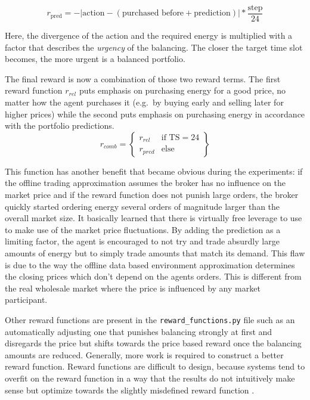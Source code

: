 \begin{equation}
    r_{\text{pred}} = - | \text{action} - (\text{purchased before} + \text{prediction}) | * \frac{\text{step}}{24}
\end{equation}

Here, the divergence of the action and the required energy is multiplied with a factor that describes the \emph{urgency}
of the balancing. The closer the target time slot becomes, the more urgent is a balanced portfolio.

The final reward is now a combination of those two reward terms. The first reward function $r_{rel}$ puts emphasis on purchasing
energy for a good price, no matter how the agent purchases it (e.g.\ by buying early and selling later for higher
prices) while the second puts emphasis on purchasing energy in accordance with the portfolio predictions. 
\begin{equation}
    r_{comb} = \left\{
        \begin{array}{lr}
            r_{rel} & \text{if TS} = 24 \\
            r_{pred} & \text{else} 
        \end{array}
    \right\}
\end{equation}

This function has another benefit that became obvious during the experiments: if the offline trading approximation
assumes the broker has no influence on the market price and if the reward function does not punish large orders, the
broker quickly started ordering energy several orders of magnitude larger than the overall market size. It basically
learned that there is virtually free leverage to use to make use of the market price fluctuations. By adding the
prediction as a limiting factor, the agent is encouraged to not try and trade absurdly large amounts of energy but to
simply trade amounts that match its demand. This flaw is due to the way the offline data based environment approximation
determines the closing prices which don't depend on the agents orders. This is different from the real wholesale market
where the price is influenced by any market participant.

Other reward functions are present in the \texttt{reward\_functions.py} file such as an automatically adjusting one that
punishes balancing strongly at first and disregards the price but shifts towards the price based reward once the
balancing amounts are reduced. Generally, more work is required to construct a better reward function.
Reward functions are difficult to design, because systems tend to overfit on the reward function in a way that the
results do not intuitively make sense but optimize towards the slightly misdefined reward function
\cite[]{amodei2016concrete}.  

